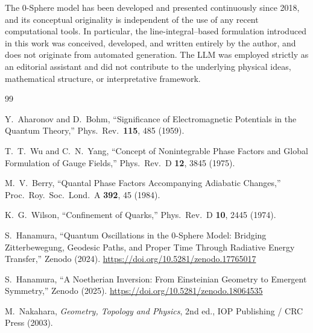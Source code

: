 \documentclass[%
 reprint,
 amsmath,amssymb,
 aps,
 prb,
]{revtex4-2}
\numberwithin{equation}{section}
\begin{document}
The 0-Sphere model has been developed and presented continuously since 2018, and its conceptual originality is independent of the use of any recent computational tools. In particular, the line-integral--based formulation introduced in this work was conceived, developed, and written entirely by the author, and does not originate from automated generation. The LLM was employed strictly as an editorial assistant and did not contribute to the underlying physical ideas, mathematical structure, or interpretative framework.


\clearpage

\begin{thebibliography}{99}

Y.~Aharonov and D.~Bohm,
``Significance of Electromagnetic Potentials in the Quantum Theory,''
Phys.\ Rev.\ \textbf{115}, 485 (1959).

T.~T.~Wu and C.~N.~Yang,
``Concept of Nonintegrable Phase Factors and Global Formulation of Gauge Fields,''
Phys.\ Rev.\ D \textbf{12}, 3845 (1975).

M.~V.~Berry,
``Quantal Phase Factors Accompanying Adiabatic Changes,''
Proc.\ Roy.\ Soc.\ Lond.\ A \textbf{392}, 45 (1984).

K.~G.~Wilson,
``Confinement of Quarks,''
Phys.\ Rev.\ D \textbf{10}, 2445 (1974).

S.~Hanamura,
``Quantum Oscillations in the 0-Sphere Model: Bridging Zitterbewegung, Geodesic Paths, and Proper Time Through Radiative Energy Transfer,''
Zenodo (2024).
\href{https://doi.org/10.5281/zenodo.17765017}{https://doi.org/10.5281/zenodo.17765017}

S.~Hanamura,
``A Noetherian Inversion: From Einsteinian Geometry to Emergent Symmetry,''
Zenodo (2025).
\href{https://doi.org/10.5281/zenodo.18064535}{https://doi.org/10.5281/zenodo.18064535}

M.~Nakahara,
\textit{Geometry, Topology and Physics},
2nd ed., IOP Publishing / CRC Press (2003).


\end{thebibliography}
\end{document}

